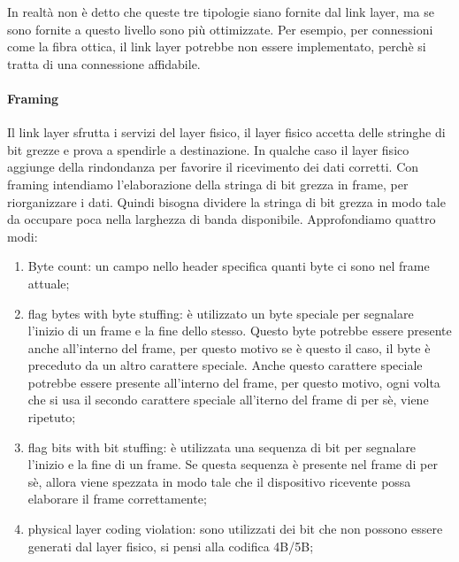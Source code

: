\documentclass{article}
\begin{document}
In realtà non è detto che queste tre tipologie siano fornite dal link layer, ma
se sono fornite a questo livello sono più ottimizzate. Per esempio, per
connessioni come la fibra ottica, il link layer potrebbe non essere
implementato, perchè si tratta di una connessione affidabile.

\paragraph{Framing}
Il link layer sfrutta i servizi del layer fisico, il layer fisico accetta delle
stringhe di bit grezze e prova a spendirle a destinazione. In qualche caso il
layer fisico aggiunge della rindondanza per favorire il ricevimento dei dati
corretti. Con framing intendiamo l'elaborazione della stringa di bit grezza in
frame, per riorganizzare i dati. Quindi bisogna dividere la stringa di bit
grezza in modo tale da occupare poca nella larghezza di banda disponibile.
Approfondiamo quattro modi:
\begin{enumerate}
	\item Byte count: un campo nello header specifica quanti byte ci sono nel
	      frame attuale;

	\item flag bytes with byte stuffing: è utilizzato un byte speciale per
	      segnalare l'inizio di un frame e la fine dello stesso. Questo byte
	      potrebbe essere presente anche all'interno del frame, per questo motivo
	      se è questo il caso, il byte è preceduto da un altro carattere speciale.
	      Anche questo carattere speciale potrebbe essere presente all'interno del
	      frame, per questo motivo, ogni volta che si usa il secondo carattere
	      speciale all'iterno del frame di per sè, viene ripetuto;

	\item flag bits with bit stuffing: è utilizzata una sequenza di bit per
	      segnalare l'inizio e la fine di un frame. Se questa sequenza è presente
	      nel frame di per sè, allora viene spezzata in modo tale che il
	      dispositivo ricevente possa elaborare il frame correttamente;

	\item physical layer coding violation: sono utilizzati dei bit che non
	      possono essere generati dal layer fisico, si pensi alla codifica 4B/5B;
\end{enumerate}
\end{document}
